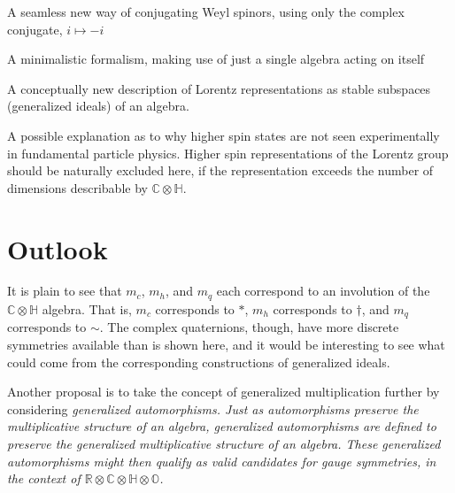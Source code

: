 \documentclass[letterpaper,12pt,titlepage,oneside,final]{book}
\newcommand{\CH}{\mathbb{C}\otimes\mathbb{H}}
\newcommand{\RCHO}{\mathbb{R}\otimes\mathbb{C}\otimes\mathbb{H}\otimes\mathbb{O}}
\begin{document}


\noindent* A seamless new way of conjugating Weyl spinors, using only the complex conjugate, $i\mapsto-i$




\noindent* A minimalistic formalism, making use of just a single algebra acting on itself

\noindent *  A conceptually new description of Lorentz representations as stable subspaces (generalized ideals) of an algebra.

\noindent *  A possible explanation as to why higher spin states are not seen experimentally in fundamental particle physics.  Higher spin representations of the Lorentz group should be naturally excluded here, if the representation exceeds the number of dimensions describable by $\CH$. 







\section{Outlook}

It is plain to see that $m_c$, $m_h$, and $m_q$ each correspond to an involution of the $\CH$ algebra.  That is, $m_c$ corresponds to  $*$, $m_h$ corresponds to $\dagger$, and $m_q$ corresponds to $\sim$.  The complex quaternions, though, have more discrete symmetries available than is shown here, and it would be interesting to see what could come from the corresponding constructions of generalized ideals. 

Another proposal is to take the concept of generalized multiplication further by considering \it generalized automorphisms. \rm  Just as automorphisms preserve the multiplicative structure of an algebra, generalized automorphisms are defined to preserve the \it generalized \rm multiplicative structure of an algebra.  These generalized automorphisms might then qualify as valid candidates for gauge symmetries, in the context of $\RCHO$. 
\end{document}
